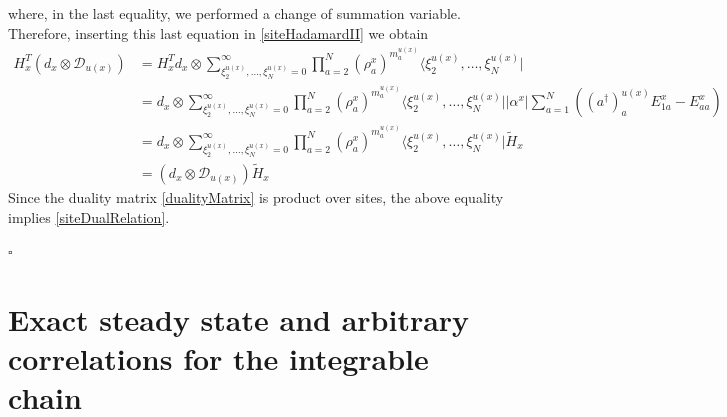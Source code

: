 \documentclass[11pt]{article}
\numberwithin{equation}{section}
\numberwithin{equation}{subsection}
\newcommand{\dd}{\mathcal{D}_{u(x)}}
\begin{document}
where, in the last equality, we performed a change of summation variable. Therefore, inserting this last equation in \eqref{siteHadamardII} we obtain 
\begin{equation}
    \begin{split}
H_{x}^{T}\left(d_{x}\otimes \dd\right)&=
     H_{x}^{T}d_{x}\otimes \sum_{\xi_{2}^{u(x)},\ldots,\xi_{N}^{u(x)}=0}^{\infty}\prod_{a=2}^{N}\left(\rho_{a}^{x}\right)^{m_{a}^{u(x)}}\langle \xi_{2}^{u(x)},\ldots,\xi_{N}^{u(x)}|
\\&=
d_{x}\otimes \sum_{\xi_{2}^{u(x)},\ldots,\xi_{N}^{u(x)}=0}^{\infty}\prod_{a=2}^{N}\left(\rho_{a}^{x}\right)^{m_{a}^{u(x)}}\langle \xi_{2}^{u(x)},\ldots,\xi_{N}^{u(x)}||\alpha^{x}|\sum_{a=1}^{N}\left((a^{\dagger})_{a}^{u(x)}E_{1a}^{x}-E_{aa}^{x}\right)   
\\&=
d_{x}\otimes \sum_{\xi_{2}^{u(x)},\ldots,\xi_{N}^{u(x)}=0}^{\infty}\prod_{a=2}^{N}\left(\rho_{a}^{x}\right)^{m_{a}^{u(x)}}\langle \xi_{2}^{u(x)},\ldots,\xi_{N}^{u(x)}|\widetilde{H}_{x}
\\&=
\left(d_{x}\otimes \dd\right)\widetilde{H}_{x}
    \end{split}
\end{equation}
Since the duality matrix \eqref{dualityMatrix} is product over sites, the above equality implies \eqref{siteDualRelation}. 
\begin{flushright}
$\square$
\end{flushright}









\section{Exact steady state and arbitrary correlations for the integrable chain}\label{sectionIntegrabiliy}
\end{document}
